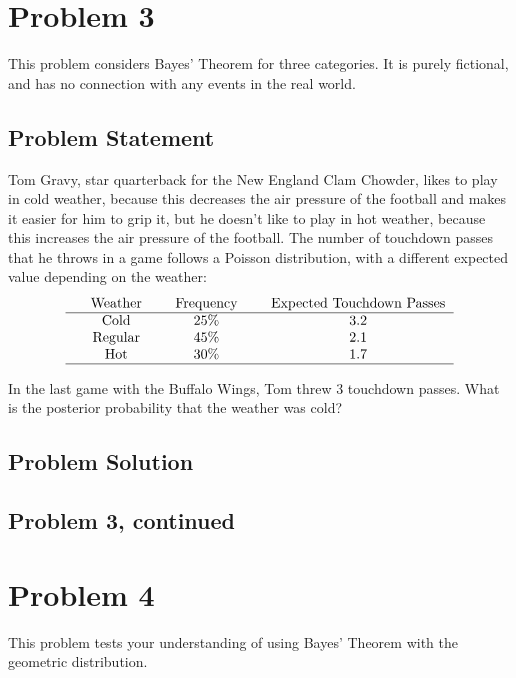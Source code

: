 \documentclass[12pt]{article}
\theoremstyle{definition}
\begin{document}
\newpage
\section*{Problem 3}

This problem considers Bayes' Theorem for three categories. It is purely fictional, and has no connection with any events in the real world.

\subsection*{Problem Statement}

Tom Gravy, star quarterback for the New England Clam Chowder, likes to play in cold weather, because this decreases the air pressure of the football and makes it easier for him to grip it, but he doesn't like to play in hot weather, because this increases the air pressure of the football. The number of touchdown passes that he throws in a game follows a Poisson distribution, with a different expected value depending on the weather:
$$
\begin{tabular}{ccccccc}
& Weather & & Frequency & & Expected Touchdown Passes\\
\hline
& Cold & & 25\% & & 3.2\\
& Regular & & 45\% & & 2.1\\
& Hot & & 30\% & & 1.7\\
\hline
\end{tabular}
$$

\bigskip
In the last game with the Buffalo Wings, Tom threw 3 touchdown passes. What is the posterior probability that the weather was cold?


\subsection*{Problem Solution}


\newpage
\subsection*{Problem 3, continued}





\newpage
\section*{Problem 4}

This problem tests your understanding of using Bayes' Theorem with the geometric distribution.
\end{document}
